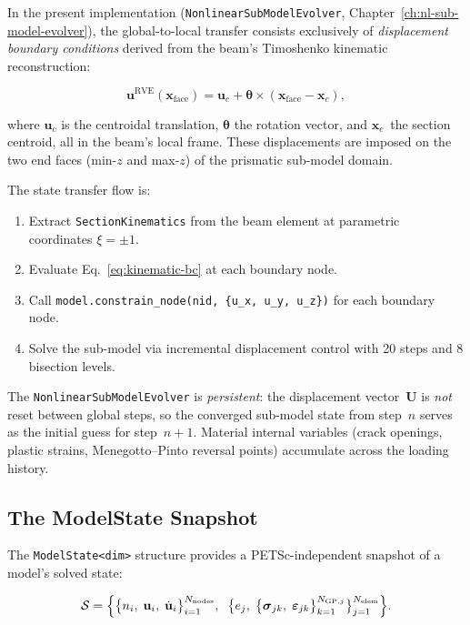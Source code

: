 In the present implementation
(\texttt{NonlinearSubModelEvolver}, Chapter~\ref{ch:nl-sub-model-evolver}),
the global-to-local transfer consists exclusively of
\emph{displacement boundary conditions} derived from the beam's
Timoshenko kinematic reconstruction:

\begin{equation}
  \mathbf{u}^{\text{RVE}}(\mathbf{x}_{\text{face}})
    = \mathbf{u}_c + \boldsymbol{\theta} \times
      (\mathbf{x}_{\text{face}} - \mathbf{x}_c),
  \label{eq:kinematic-bc}
\end{equation}

where $\mathbf{u}_c$ is the centroidal translation,
$\boldsymbol{\theta}$ the rotation vector, and
$\mathbf{x}_c$~the section centroid, all in the beam's local frame.
These displacements are imposed on the two end faces (min-$z$
and max-$z$) of the prismatic sub-model domain.

The state transfer flow is:
\begin{enumerate}
  \item Extract \texttt{SectionKinematics} from the beam element
    at parametric coordinates $\xi = \pm 1$.
  \item Evaluate Eq.~\eqref{eq:kinematic-bc} at each boundary node.
  \item Call \verb|model.constrain_node(nid, {u_x, u_y, u_z})| for
    each boundary node.
  \item Solve the sub-model via incremental displacement control
    with 20 steps and 8 bisection levels.
\end{enumerate}

The \texttt{NonlinearSubModelEvolver} is \emph{persistent}: the
displacement vector~$\mathbf{U}$ is \emph{not} reset between
global steps, so the converged sub-model state from step~$n$ serves
as the initial guess for step~$n+1$.  Material internal variables
(crack openings, plastic strains, Menegotto--Pinto reversal points)
accumulate across the loading history.

\subsection{The ModelState Snapshot}
\label{ssec:model-state}

The \texttt{ModelState<dim>} structure provides a PETSc-independent
snapshot of a model's solved state:

\begin{equation}
  \mathcal{S} = \Bigl\{
    \bigl\{n_i,\; \mathbf{u}_i,\; \dot{\mathbf{u}}_i\bigr\}_{i=1}^{N_{\text{nodes}}},
    \;\;
    \bigl\{e_j,\;
      \bigl\{\boldsymbol{\sigma}_{jk},\;
             \boldsymbol{\varepsilon}_{jk}
      \bigr\}_{k=1}^{N_{\text{GP},j}}
    \bigr\}_{j=1}^{N_{\text{elem}}}
  \Bigr\}.
  \label{eq:model-state}
\end{equation}

